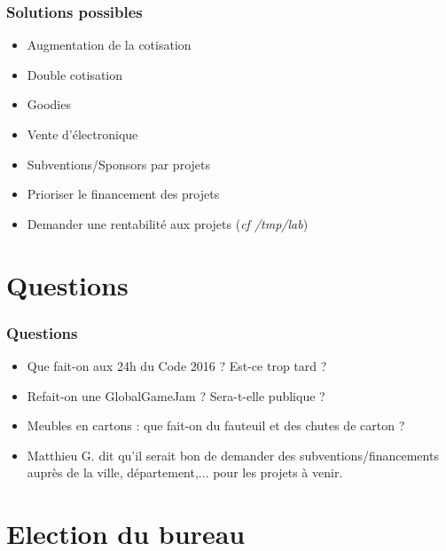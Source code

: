 \documentclass[10pt, compress]{beamer}
\begin{document}
\begin{frame}
	\frametitle{Solutions possibles}
	\begin{itemize}
		\item Augmentation de la cotisation
		\item Double cotisation
		\item Goodies
		\item Vente d'électronique
		\item Subventions/Sponsors par projets
		\item Prioriser le financement des projets
		\item Demander une rentabilité aux projets (\textit{cf /tmp/lab})
	\end{itemize}
\end{frame}


\section{Questions}

\begin{frame}
	\frametitle{Questions}
\begin{itemize}
	\item Que fait-on aux \alert{24h du Code 2016} ? Est-ce trop tard ?
	\item Refait-on une \alert{GlobalGameJam} ? Sera-t-elle publique ?
	\item Meubles en cartons : que fait-on du \alert{fauteuil} et des \alert{chutes de carton} ?
	\item Matthieu G. dit qu'il serait bon de demander des \alert{subventions/financements} auprès de la ville, département,... pour les projets à venir.
\end{itemize}

\end{frame}

\section{Election du bureau}
\end{document}
